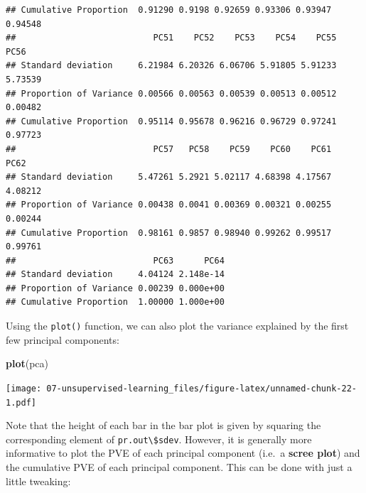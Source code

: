 \documentclass[openany]{book}
\newenvironment{Shaded}{\begin{snugshade}}{\end{snugshade}}
\newcommand{\DataTypeTok}[1]{\textcolor[rgb]{0.13,0.29,0.53}{#1}}
\newcommand{\DecValTok}[1]{\textcolor[rgb]{0.00,0.00,0.81}{#1}}
\newcommand{\KeywordTok}[1]{\textcolor[rgb]{0.13,0.29,0.53}{\textbf{#1}}}
\newcommand{\NormalTok}[1]{#1}
\newcommand{\OperatorTok}[1]{\textcolor[rgb]{0.81,0.36,0.00}{\textbf{#1}}}
\newcommand{\StringTok}[1]{\textcolor[rgb]{0.31,0.60,0.02}{#1}}
\begin{document}
\begin{verbatim}
## Cumulative Proportion  0.91290 0.9198 0.92659 0.93306 0.93947 0.94548
##                           PC51    PC52    PC53    PC54    PC55    PC56
## Standard deviation     6.21984 6.20326 6.06706 5.91805 5.91233 5.73539
## Proportion of Variance 0.00566 0.00563 0.00539 0.00513 0.00512 0.00482
## Cumulative Proportion  0.95114 0.95678 0.96216 0.96729 0.97241 0.97723
##                           PC57   PC58    PC59    PC60    PC61    PC62
## Standard deviation     5.47261 5.2921 5.02117 4.68398 4.17567 4.08212
## Proportion of Variance 0.00438 0.0041 0.00369 0.00321 0.00255 0.00244
## Cumulative Proportion  0.98161 0.9857 0.98940 0.99262 0.99517 0.99761
##                           PC63      PC64
## Standard deviation     4.04124 2.148e-14
## Proportion of Variance 0.00239 0.000e+00
## Cumulative Proportion  1.00000 1.000e+00
\end{verbatim}

Using the \texttt{plot()} function, we can also plot the variance explained by the
first few principal components:

\begin{Shaded}
\begin{Highlighting}[]
\KeywordTok{plot}\NormalTok{(pca)}
\end{Highlighting}
\end{Shaded}

\texttt{[image: 07-unsupervised-learning\_files/figure-latex/unnamed-chunk-22-1.pdf]}

Note that the height of each bar in the bar plot is given by squaring the
corresponding element of \texttt{pr.out\textbackslash{}\$sdev}. However, it is generally more informative to
plot the PVE of each principal component (i.e.~a \textbf{scree plot}) and the cumulative
PVE of each principal component. This can be done with just a
little tweaking:

\begin{Shaded}
\end{Shaded}
\end{document}
